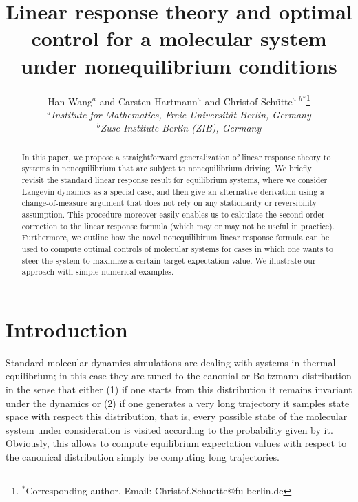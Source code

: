 \documentclass[]{tMPH2e}
\begin{document}
\title{Linear response theory and optimal control for a molecular system under nonequilibrium conditions}

\author{Han Wang$^{a}$ and Carsten Hartmann$^{a}$ and Christof Sch\"utte$^{a,b}$$^{\ast}$\thanks{$^\ast$Corresponding author. Email: Christof.Schuette@fu-berlin.de}\\\vspace{6pt}$^{a}${\em Institute for Mathematics, Freie Universit\"at Berlin, Germany}\\$^{b}${\em Zuse Institute Berlin (ZIB), Germany}}
  


\maketitle

\begin{abstract}
  In this paper, we propose a straightforward generalization of linear response theory to systems in nonequilibrium that are subject to nonequilibrium driving. 
  We briefly revisit the standard linear response result for equilibrium systems, where we consider Langevin dynamics as a special case, and then give an alternative derivation using a change-of-measure argument that does not rely on any stationarity or reversibility assumption. This procedure moreover easily enables us to calculate the second order correction to the linear response formula (which may or may not be useful in practice). Furthermore, we outline how the novel nonequilibirum linear response formula can be used to compute optimal controls of molecular systems for cases in which one wants to steer the system to maximize a certain target expectation value. We illustrate our approach with simple numerical examples. 
\end{abstract}


\section{Introduction}

Standard molecular dynamics simulations are dealing with systems in thermal equilibrium; in this case they are tuned to the canonial or Boltzmann distribution in the sense that either (1) if one starts from this distribution it remains invariant under the dynamics or (2) if one generates a very long trajectory it samples state space with respect this distribution, that is, every possible state of the molecular system under consideration is visited according to the probability given by it.  Obviously, this allows to compute equilibrium expectation values with respect to the  canonical distribution simply be computing long trajectories. 
\end{document}
